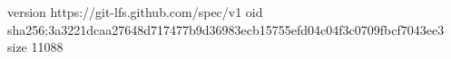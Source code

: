 version https://git-lfs.github.com/spec/v1
oid sha256:3a3221dcaa27648d717477b9d36983ecb15755efd04c04f3c0709fbcf7043ee3
size 11088
